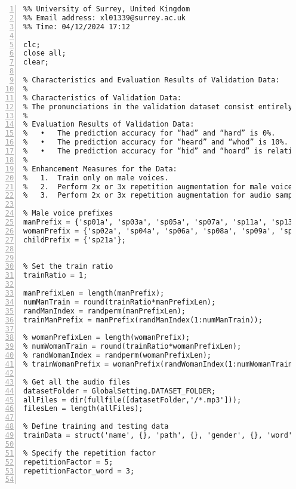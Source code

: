 \documentclass{article}
\begin{document}
\begin{lstlisting}[frame=single, numbers=left, style=Matlab-editor, caption={data\_augmentation.m}, label={lst:data_augmentation}]
  %% Author: Xiaoguang Liang (PG/T - Comp Sci & Elec Eng)
%% University of Surrey, United Kingdom
%% Email address: xl01339@surrey.ac.uk
%% Time: 04/12/2024 17:12

clc;
close all;
clear;

% Characteristics and Evaluation Results of Validation Data:
%
% Characteristics of Validation Data:
% The pronunciations in the validation dataset consist entirely of male voices across 11 groups of words.
%
% Evaluation Results of Validation Data:
% 	•	The prediction accuracy for “had” and “hard” is 0%.
% 	•	The prediction accuracy for “heard” and “whod” is 10%.
% 	•	The prediction accuracy for “hid” and “hoard” is relatively high, at 90% and 100%, respectively.
%
% Enhancement Measures for the Data:
% 	1.	Train only on male voices.
% 	2.	Perform 2x or 3x repetition augmentation for male voice recordings.
% 	3.	Perform 2x or 3x repetition augmentation for audio samples of the words “had,” “hard,” “heard,” and “whod.”

% Male voice prefixes
manPrefix = {'sp01a', 'sp03a', 'sp05a', 'sp07a', 'sp11a', 'sp13a', 'sp14a', 'sp15a', 'sp17a', 'sp22a', 'sp24a', 'sp26a', 'sp28a', 'sp30a'};
womanPrefix = {'sp02a', 'sp04a', 'sp06a', 'sp08a', 'sp09a', 'sp10a', 'sp12a', 'sp16a', 'sp18a', 'sp19a', 'sp20a', 'sp23a', 'sp25a', 'sp27a', 'sp29a'};
childPrefix = {'sp21a'};


% Set the train ratio
trainRatio = 1;

manPrefixLen = length(manPrefix);
numManTrain = round(trainRatio*manPrefixLen);
randManIndex = randperm(manPrefixLen);
trainManPrefix = manPrefix(randManIndex(1:numManTrain));

% womanPrefixLen = length(womanPrefix);
% numWomanTrain = round(trainRatio*womanPrefixLen);
% randWomanIndex = randperm(womanPrefixLen);
% trainWomanPrefix = womanPrefix(randWomanIndex(1:numWomanTrain));

% Get all the audio files
datasetFolder = GlobalSetting.DATASET_FOLDER;
allFiles = dir(fullfile([datasetFolder,'/*.mp3']));
filesLen = length(allFiles);

% Define training and testing data
trainData = struct('name', {}, 'path', {}, 'gender', {}, 'word', {}, 'sampleData', {}, 'sampleRate', {}');

% Specify the repetition factor
repetitionFactor = 5;
repetitionFactor_word = 3;


\end{lstlisting}
\end{document}
